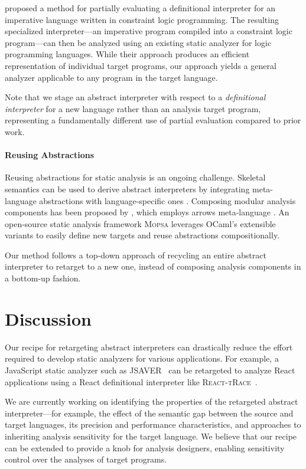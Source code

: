\documentclass[sigplan,screen]{acmart}
\begin{document}
 proposed a method for partially evaluating a definitional interpreter for an imperative language written in constraint logic programming.
The resulting specialized interpreter---an imperative program compiled into a constraint logic program---can then be analyzed using an existing static analyzer for logic programming languages.
While their approach produces an efficient representation of individual target programs, our approach yields a general analyzer applicable to any program in the target language.

Note that we stage an abstract interpreter with respect to a \emph{definitional interpreter} for a new language rather than an analysis target program, representing a fundamentally different use of partial evaluation compared to prior work.

\paragraph{Reusing Abstractions}
Reusing abstractions for static analysis is an ongoing challenge.
Skeletal semantics \citep{BodGarJenSch19Skeletal} can be used to derive abstract interpreters by integrating meta-language abstractions with language-specific ones \citep{JenRebSch23Deriving}.
Composing modular analysis components has been proposed by \citet{KeiErd19Sound}, which employs arrows meta-language \citep{Hug00Generalising}.
An open-source static analysis framework \textsc{Mopsa} \citep{JouMinMonOua20Combinations} leverages OCaml's extensible variants to easily define new targets and reuse abstractions compositionally.

Our method follows a top-down approach of recycling an entire abstract interpreter to retarget to a new one, instead of composing analysis components in a bottom-up fashion.


\section{Discussion}\label{sec:discuss}
Our recipe for retargeting abstract interpreters can drastically reduce the effort required to develop static analyzers for various applications.
For example, a JavaScript static analyzer such as JSAVER~\citep{ParAnRyu22Automatically} can be retargeted to analyze React applications using a React definitional interpreter like \textsc{\textsf{React-tRace}}~\citep{LeeAhnYi25React}.

We are currently working on identifying the properties of the retargeted abstract interpreter---for example, the effect of the semantic gap between the source and target languages, its precision and performance characteristics, and approaches to inheriting analysis sensitivity for the target language.
We believe that our recipe can be extended to provide a knob for analysis designers, enabling sensitivity control over the analyses of target programs.
\end{document}
